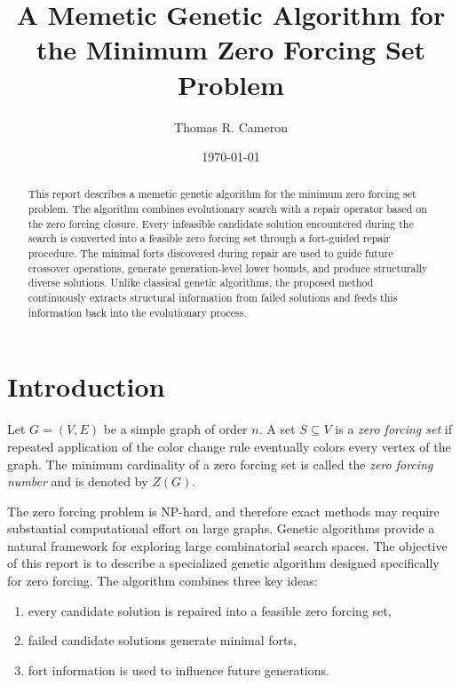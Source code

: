 \documentclass[11pt]{article}
\title{A Memetic Genetic Algorithm for the Minimum Zero Forcing Set Problem}
\author{Thomas R. Cameron}
\date{\today}
\begin{document}
\maketitle

\begin{abstract}
This report describes a memetic genetic algorithm for the minimum
zero forcing set problem. The algorithm combines evolutionary search
with a repair operator based on the zero forcing closure. Every
infeasible candidate solution encountered during the search is
converted into a feasible zero forcing set through a fort-guided
repair procedure. The minimal forts discovered during repair are
used to guide future crossover operations, generate generation-level
lower bounds, and produce structurally diverse solutions. Unlike
classical genetic algorithms, the proposed method continuously
extracts structural information from failed solutions and feeds this
information back into the evolutionary process.
\end{abstract}

\section{Introduction}

Let $G=(V,E)$ be a simple graph of order $n$. A set
$S \subseteq V$ is a \emph{zero forcing set} if repeated application
of the color change rule eventually colors every vertex of the graph.
The minimum cardinality of a zero forcing set is called the
\emph{zero forcing number} and is denoted by $Z(G)$.

The zero forcing problem is NP-hard, and therefore exact methods
may require substantial computational effort on large graphs.
Genetic algorithms provide a natural framework for exploring
large combinatorial search spaces. 
The objective of this report is to describe a specialized genetic
algorithm designed specifically for zero forcing. The algorithm
combines three key ideas:

\begin{enumerate}[label=(\roman*)]
\item every candidate solution is repaired into a feasible
zero forcing set,

\item failed candidate solutions generate minimal forts,

\item fort information is used to influence future generations.
\end{enumerate}
\end{document}

